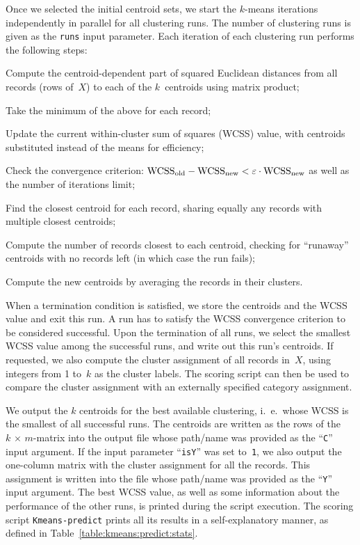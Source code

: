 Once we selected the initial centroid sets, we start the $k$-means iterations
independently in parallel for all clustering runs.  The number of clustering runs
is given as the {\tt runs} input parameter.  Each iteration of each clustering run
performs the following steps:
\begin{Itemize}
\item Compute the centroid-dependent part of squared Euclidean distances from
all records (rows of~$X$) to each of the $k$~centroids using matrix product;
\item Take the minimum of the above for each record;
\item Update the current within-cluster sum of squares (WCSS) value, with centroids
substituted instead of the means for efficiency;
\item Check the convergence criterion:\hfil
$\textrm{WCSS}_{\mathrm{old}} - \textrm{WCSS}_{\mathrm{new}} < \varepsilon\cdot\textrm{WCSS}_{\mathrm{new}}$\linebreak
as well as the number of iterations limit;
\item Find the closest centroid for each record, sharing equally any records with multiple
closest centroids;
\item Compute the number of records closest to each centroid, checking for ``runaway''
centroids with no records left (in which case the run fails);
\item Compute the new centroids by averaging the records in their clusters.
\end{Itemize}
When a termination condition is satisfied, we store the centroids and the WCSS value
and exit this run.  A run has to satisfy the WCSS convergence criterion to be considered
successful.  Upon the termination of all runs, we select the smallest WCSS value among
the successful runs, and write out this run's centroids.  If requested, we also compute
the cluster assignment of all records in~$X$, using integers from 1 to~$k$ as the cluster
labels.  The scoring script can then be used to compare the cluster assignment with
an externally specified category assignment.

\smallskip
{}
\smallskip

We output the $k$ centroids for the best available clustering, i.~e.\ whose WCSS
is the smallest of all successful runs.
The centroids are written as the rows of the $k\,{\times}\,m$-matrix into the output
file whose path/name was provided as the ``{\tt C}'' input argument.  If the input
parameter ``{\tt isY}'' was set to~{\tt 1}, we also output the one-column matrix with
the cluster assignment for all the records.  This assignment is written into the
file whose path/name was provided as the ``{\tt Y}'' input argument.
The best WCSS value, as well as some information about the performance of the other
runs, is printed during the script execution.  The scoring script {\tt Kmeans-predict}
prints all its results in a self-explanatory manner, as defined in
Table~\ref{table:kmeans:predict:stats}.


